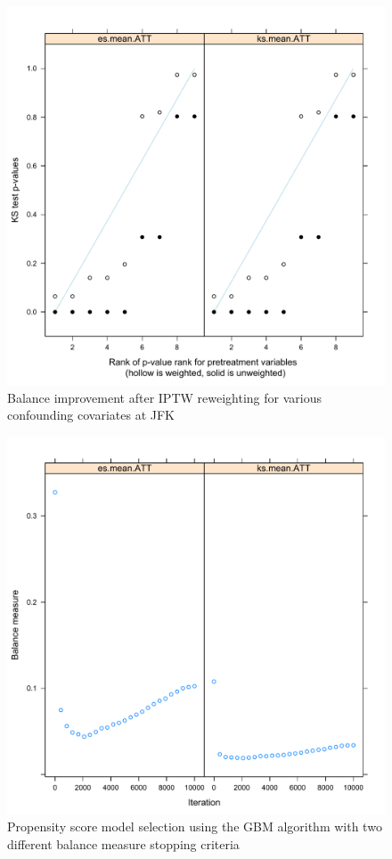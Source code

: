 \documentclass[11pt]{scrartcl}
\begin{document}
\begin{figure}[h!]
\includegraphics[width=\textwidth]{./figs/taf_jfk_twang_kstestPvals.pdf}
\caption{Balance improvement after IPTW reweighting for various confounding covariates at JFK}
\label{fig:sil}
\end{figure}

\begin{figure}[h!]
\includegraphics[width=\textwidth]{./figs/taf_twang_BalanceMeasureGBMiterations.pdf}
\caption{Propensity score model selection using the GBM algorithm with two different balance measure stopping criteria}
\label{fig:sil}
\end{figure}
\end{document}
